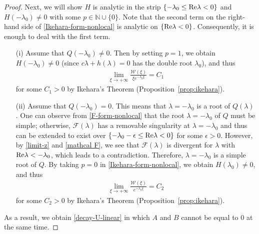 \documentclass[11pt,a4paper]{article}
\numberwithin{equation}{section}
\numberwithin{figure}{section}
\newcommand\beaa{\begin{eqnarray*}}
\newcommand\eeaa{\end{eqnarray*}}
\begin{document}
\begin{proof}
Next, we will show $H$ is analytic in the strip $\{-\lambda_0\leq  {\rm Re}\lambda<0\}$ and $H(-\lambda_0)\neq 0$ with some $p\in\mathbb{N}\cup\{0\}$.
Note that the second term on the right-hand side of \eqref{Ikehara-form-nonlocal} is analytic on $\{{\rm Re}\lambda<0\}$. 
Consequently, it is enough to deal with the first term. 
\begin{itemize}
    \item[(i)] Assume that
$Q(-\lambda_0)\neq 0$. Then
 by setting $p=1$, we obtain $H(-\lambda_0)\neq 0$ (since $c\lambda+h(\lambda)=0$ has the double root $\lambda_0$), and thus
\beaa
\lim_{\xi\to+\infty}\frac{\mathcal{W}(\xi)}{\xi e^{-\lambda_0\xi}}=C_1
\eeaa
for some $C_1>0$ by Ikehara's Theorem (Proposition~\ref{prop:ikehara}).
\item[(ii)] Assume that
$Q(-\lambda_0)=0$. This means that $\lambda=-\lambda_0$ is a root of $Q(\lambda)$.
One can observe from \eqref{F-form-nonlocal} that the root $\lambda=-\lambda_0$ of $Q$ must be simple; otherwise, $\mathcal{F}(\lambda)$ has a removable singularity at $\lambda=-\lambda_0$ and thus can
be extended to exist over $\{ -\lambda_0-\epsilon\leq  {\rm Re} \lambda<0\}$
for some $\epsilon>0$. However, by \eqref{limit-z} and \eqref{mathcal F}, we see that $\mathcal{F}(\lambda)$ is divergent for
$\lambda$ with ${\rm Re} \lambda<-\lambda_0$,
which leads to a contradiction. Therefore, $\lambda=-\lambda_0$ is a simple root of $Q$.
By taking $p=0$ in \eqref{Ikehara-form-nonlocal}, we obtain $H(\lambda_0)\neq 0$, and thus
\beaa
\lim_{\xi\to+\infty}\frac{\mathcal{W}(\xi)}{e^{-\lambda_0\xi}}=C_2
\eeaa
for some $C_2>0$ by Ikehara's Theorem (Proposition~\ref{prop:ikehara}).
\end{itemize}
As a result, we obtain \eqref{decay-U-linear} in which $A$ and $B$ cannot be equal to $0$ at the same time. 
\end{proof}
\end{document}
